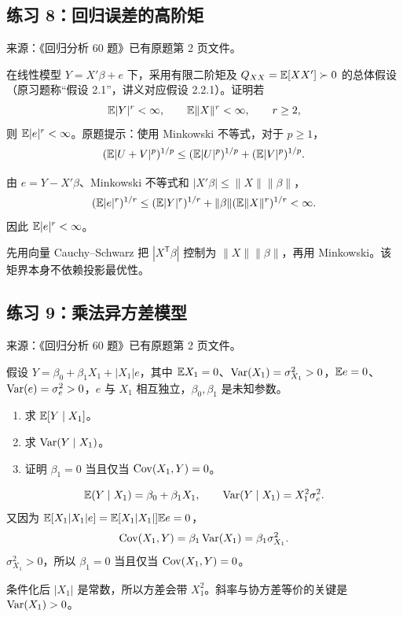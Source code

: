 \subsection*{练习 8：回归误差的高阶矩}
\begin{homework}[练习 8]
\textsf{来源：《回归分析 60 题》已有原题第 2 页文件。}\par
在线性模型 $Y=X'\beta+e$ 下，采用有限二阶矩及 $Q_{XX}=\mathbb{E}[XX']\succ0$ 的总体假设（原习题称“假设 2.1”，讲义对应假设 2.2.1）。证明若
\[\mathbb{E}|Y|^r<\infty,\qquad\mathbb{E}\|X\|^r<\infty,\qquad r\geq2,\]
则 $\mathbb{E}|e|^r<\infty$。原题提示：使用 Minkowski 不等式，对于 $p\geq1$，
\[(\mathbb{E}|U+V|^p)^{1/p}\leq(\mathbb{E}|U|^p)^{1/p}+(\mathbb{E}|V|^p)^{1/p}.\]
\end{homework}
\begin{solution}
由 $e=Y-X'\beta$、Minkowski 不等式和 $|X'\beta|\leq\|X\|\|\beta\|$，
\[
(\mathbb{E}|e|^r)^{1/r}
\leq(\mathbb{E}|Y|^r)^{1/r}
+\|\beta\|(\mathbb{E}\|X\|^r)^{1/r}<\infty.
\]
因此 $\mathbb{E}|e|^r<\infty$。
\end{solution}
\begin{dxtips}[回归误差的高阶矩]\label{hw:reg:tip:8}
先用向量 Cauchy--Schwarz 把 $|X^{\mathsf T}\beta|$ 控制为 $\|X\|\|\beta\|$，再用 Minkowski。该矩界本身不依赖投影最优性。
\end{dxtips}

\subsection*{练习 9：乘法异方差模型}
\begin{homework}[练习 9]
\textsf{来源：《回归分析 60 题》已有原题第 2 页文件。}\par
假设 $Y=\beta_0+\beta_1X_1+|X_1|e$，其中 $\mathbb{E} X_1=0$、$\operatorname{Var}(X_1)=\sigma_{X_1}^2>0$，$\mathbb{E} e=0$、$\operatorname{Var}(e)=\sigma_e^2>0$，$e$ 与 $X_1$ 相互独立，$\beta_0,\beta_1$ 是未知参数。
\begin{enumerate}
\item 求 $\mathbb{E}[Y\mid X_1]$。
\item 求 $\operatorname{Var}(Y\mid X_1)$。
\item 证明 $\beta_1=0$ 当且仅当 $\operatorname{Cov}(X_1,Y)=0$。
\end{enumerate}
\end{homework}
\begin{solution}
\[
\mathbb{E}(Y\mid X_1)=\beta_0+\beta_1X_1,
\qquad
\operatorname{Var}(Y\mid X_1)=X_1^2\sigma_e^2.
\]
又因为 $\mathbb{E}[X_1|X_1|e]=\mathbb{E}[X_1|X_1|]\mathbb{E} e=0$，
\[
\operatorname{Cov}(X_1,Y)=\beta_1\operatorname{Var}(X_1)=\beta_1\sigma_{X_1}^2.
\]
$\sigma_{X_1}^2>0$，所以 $\beta_1=0$ 当且仅当 $\operatorname{Cov}(X_1,Y)=0$。
\end{solution}
\begin{dxtips}[乘法异方差模型]\label{hw:reg:tip:9}
条件化后 $|X_1|$ 是常数，所以方差会带 $X_1^2$。斜率与协方差等价的关键是 $\operatorname{Var}(X_1)>0$。
\end{dxtips}

